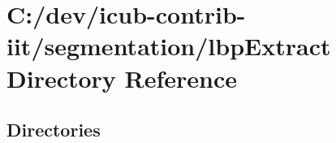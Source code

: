 \section{C\+:/dev/icub-\/contrib-\/iit/segmentation/lbp\+Extract Directory Reference}
\label{dir_8f41e0c29078472eb2b31d6f9985315a}
\subsection*{Directories}
\begin{DoxyCompactItemize}
\end{DoxyCompactItemize}

